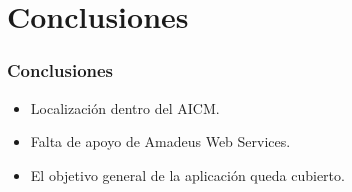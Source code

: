 \documentclass[12pt]{beamer}
\begin{document}
\section{Conclusiones}

\begin{frame}
	\frametitle{Conclusiones}
	\begin{block}{}
		\begin{itemize}
	\item Localización dentro del AICM.
	\item Falta de apoyo de Amadeus Web Services.
	\item El objetivo general de la aplicación queda cubierto.
\end{itemize}
	\end{block}
\end{frame}  
\end{document}
